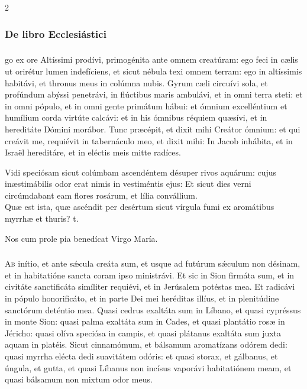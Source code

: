 \documentclass[9pt,twoside]{extarticle}
\begin{document}
\begin{multicols}{2}
\subsubsection*{\center \normalfont De libro Ecclesiástici}
\subsubsection*{}
go ex ore Altíssimi prodívi, primogénita ante omnem creatúram:
ego feci in cælis ut orirétur lumen indefíciens, et sicut nébula texi omnem terram:
ego in altíssimis habitávi, et thronus meus in colúmna nubis.
Gyrum cæli circuívi sola, et profúndum abýssi penetrávi, in flúctibus maris ambulávi,
et in omni terra steti: et in omni pópulo,
et in omni gente primátum hábui:
et ómnium excelléntium et humílium corda virtúte calcávi: et in his ómnibus réquiem quæsívi, et in hereditáte Dómini morábor.
Tunc præcépit, et dixit mihi Creátor ómnium: et qui creávit me, requiévit in tabernáculo meo,
et dixit mihi: In Jacob inhábita, et in Israël hereditáre, et in eléctis meis mitte radíces.

\begin{tightlist}{}
\item {} Vidi speciósam sicut colúmbam ascendéntem désuper rivos aquárum: cujus inæstimábilis odor erat nimis in vestiméntis ejus: \textred{*} Et sicut dies verni circúmdabant eam flores rosárum, et lília convállium.\\  Quæ est ista, quæ ascéndit per desértum sicut vírgula fumi ex aromátibus myrrhæ et thuris? t.
\item {\small {} Nos cum prole pia benedícat Virgo María.}
\end{tightlist}

\subsubsection*{\center {}}
\lettrine{A}b inítio, et ante sǽcula creáta sum, et usque ad futúrum sǽculum non désinam, et in habitatióne sancta coram ipso ministrávi.
Et sic in Sion firmáta sum, et in civitáte sanctificáta simíliter requiévi, et in Jerúsalem potéstas mea.
Et radicávi in pópulo honorificáto, et in parte Dei mei heréditas illíus, et in plenitúdine sanctórum deténtio mea.
Quasi cedrus exaltáta sum in Líbano, et quasi cypréssus in monte Sion:
quasi palma exaltáta sum in Cades, et quasi plantátio rosæ in Jéricho:
quasi olíva speciósa in campis, et quasi plátanus exaltáta sum juxta aquam in platéis.
Sicut cinnamómum, et bálsamum aromatízans odórem dedi: quasi myrrha elécta dedi suavitátem odóris:
et quasi storax, et gálbanus, et úngula, et gutta, et quasi Líbanus non incísus vaporávi habitatiónem meam, et quasi bálsamum non mixtum odor meus.


\end{multicols}
\end{document}

